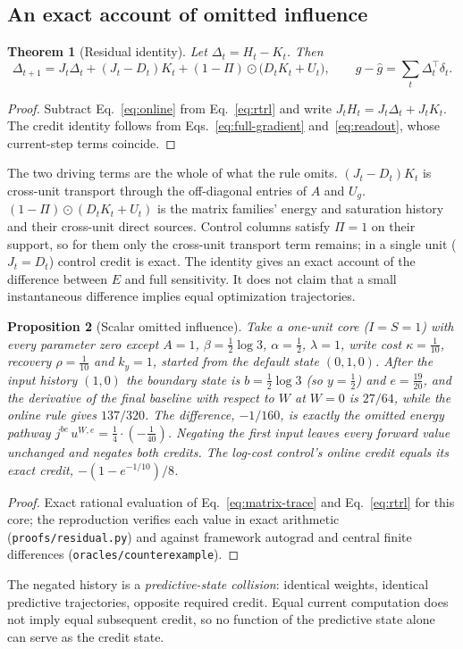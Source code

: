 \documentclass[11pt]{article}
\newtheorem{theorem}{Theorem}
\newtheorem{proposition}[theorem]{Proposition}
\theoremstyle{definition}
\newcommand{\Had}{\odot}
\begin{document}
\subsection{An exact account of omitted influence}
\label{sec:residual}
\begin{theorem}[Residual identity]
\label{thm:residual}
Let $\Delta_t=H_t-K_t$. Then
\begin{equation}
 \Delta_{t+1}=J_t\Delta_t+(J_t-D_t)K_t+(1-\Pi)\Had\big(D_tK_t+U_t\big),
 \qquad g-\widehat g=\sum_t\Delta_t^\top\delta_t .
 \label{eq:residual}
\end{equation}
\end{theorem}
\begin{proof}
Subtract Eq.~\eqref{eq:online} from Eq.~\eqref{eq:rtrl} and write
$J_tH_t=J_t\Delta_t+J_tK_t$. The credit identity follows from
Eqs.~\eqref{eq:full-gradient} and~\eqref{eq:readout}, whose current-step terms
coincide.
\end{proof}
The two driving terms are the whole of what the rule omits. $(J_t-D_t)K_t$ is
cross-unit transport through the off-diagonal entries of $A$ and $U_g$.
$(1-\Pi)\Had(D_tK_t+U_t)$ is the matrix families' energy and saturation history and
their cross-unit direct sources. Control columns satisfy $\Pi=1$ on their support,
so for them only the cross-unit transport term remains; in a single unit
($J_t=D_t$) control credit is exact. The identity gives an exact account of the
difference between $E$ and full sensitivity. It does not claim that a small
instantaneous difference implies equal optimization trajectories.

\begin{proposition}[Scalar omitted influence]
\label{prop:scalar}
Take a one-unit core ($I=S=1$) with every parameter zero except $A=1$,
$\beta=\tfrac12\log3$, $\alpha=\tfrac12$, $\lambda=1$, write cost $\kappa=\tfrac1{10}$,
recovery $\rho=\tfrac1{10}$ and $k_y=1$, started from the default state $(0,1,0)$.
After the input history $(1,0)$ the boundary state is $b=\tfrac12\log3$ (so $y=\tfrac12$)
and $e=\tfrac{19}{20}$, and the derivative of the final baseline with respect to $W$
at $W=0$ is $27/64$, while the online rule gives $137/320$. The difference, $-1/160$, is exactly the omitted
energy pathway $j^{be}\,u^{W,e}=\tfrac14\cdot(-\tfrac1{40})$. Negating the first
input leaves every forward value unchanged and negates both credits. The
log-cost control's online credit equals its exact credit, $-(1-e^{-1/10})/8$.
\end{proposition}
\begin{proof}
Exact rational evaluation of Eq.~\eqref{eq:matrix-trace} and Eq.~\eqref{eq:rtrl}
for this core; the reproduction verifies each value in exact arithmetic
(\texttt{proofs/residual.py}) and against framework autograd and central finite
differences (\texttt{oracles/counterexample}).
\end{proof}
The negated history is a \emph{predictive-state collision}: identical weights,
identical predictive trajectories, opposite required credit. Equal current
computation does not imply equal subsequent credit, so no function of the
predictive state alone can serve as the credit state.
\end{document}
